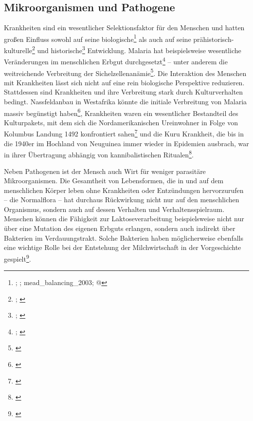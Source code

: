 \documentclass[openany,twoside,twocolumn]{book}
\let\rmarkdownfootnote\footnote%
\def\footnote{\protect\rmarkdownfootnote}
\begin{document}
\hypertarget{mikroorganismen-und-pathogene}{%
\subsection{Mikroorganismen und
Pathogene}\label{mikroorganismen-und-pathogene}}

Krankheiten sind ein wesentlicher Selektionsfaktor für den Menschen und
hatten großen Einfluss sowohl auf seine biologische\footnote{\textcite{bustamante_natural_2005};
  \textcite{enard_viruses_2016}; mead\_balancing\_2003;
  \textcite{sabeti_genome-wide_2007}@} als auch auf seine
prähistorisch-kulturelle\footnote{\textcite{martin_health_2002};
  \textcite{oxenham_skeletal_2005}} und historische\footnote{\textcite{alfani_plague_2013};
  \textcite{murray_estimation_2006}} Entwicklung. Malaria hat
beispielsweise wesentliche Veränderungen im menschlichen Erbgut
durchgesetzt\footnote{\textcite{kwiatkowski_how_2005};
  \textcite{tishkoff_haplotype_2001}} -- unter anderem die weitreichende
Verbreitung der Sichelzellenanämie\footnote{\textcite{allison_protection_1954}}.
Die Interaktion des Menschen mit Krankheiten lässt sich nicht auf eine
rein biologische Perspektive reduzieren. Stattdessen sind Krankheiten
und ihre Verbreitung stark durch Kulturverhalten bedingt. Nassfeldanbau
in Westafrika könnte die initiale Verbreitung von Malaria massiv
begünstigt haben\footnote{\textcite{durham_coevolution_1991-1}},
Krankheiten waren ein wesentlicher Bestandteil des Kulturpakets, mit dem
sich die Nordamerikanischen Ureinwohner in Folge von Kolumbus Landung
1492 konfrontiert sahen\footnote{\textcite{nunn_columbian_2010}} und die
Kuru Krankheit, die bis in die 1940er im Hochland von Neuguinea immer
wieder in Epidemien ausbrach, war in ihrer Übertragung abhängig von
kannibalistischen Ritualen\footnote{\textcite{lindenbaum_kuru_2015}}.

Neben Pathogenen ist der Mensch auch Wirt für weniger parasitäre
Mikroorganismen. Die Gesamtheit von Lebensformen, die in und auf dem
menschlichen Körper leben ohne Krankheiten oder Entzündungen
hervorzurufen -- die Normalflora -- hat durchaus Rückwirkung nicht nur
auf den menschlichen Organismus, sondern auch auf dessen Verhalten und
Verhaltensspielraum. Menschen können die Fähigkeit zur
Laktoseverarbeitung beispielsweise nicht nur über eine Mutation des
eigenen Erbguts erlangen, sondern auch indirekt über Bakterien im
Verdauungstrakt. Solche Bakterien haben möglicherweise ebenfalls eine
wichtige Rolle bei der Entstehung der Milchwirtschaft in der
Vorgeschichte gespielt\footnote{\textcite{walter_human_2011}}.
\end{document}
